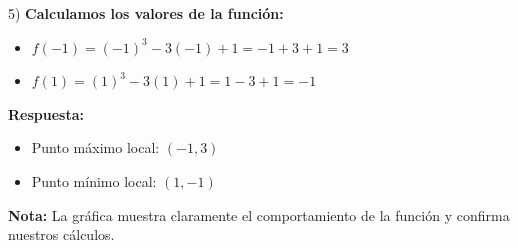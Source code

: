 \begin{ejercicio}
\begin{solucion}
5) \textbf{Calculamos los valores de la función:}
   \begin{itemize}
   \item $f(-1) = (-1)^3 - 3(-1) + 1 = -1 + 3 + 1 = 3$
   \item $f(1) = (1)^3 - 3(1) + 1 = 1 - 3 + 1 = -1$
   \end{itemize}

\textbf{Respuesta:}
\begin{itemize}
\item Punto máximo local: $(-1, 3)$
\item Punto mínimo local: $(1, -1)$
\end{itemize}

\textbf{Nota:} La gráfica muestra claramente el comportamiento de la función y confirma nuestros cálculos.
\end{solucion}
\end{ejercicio}
